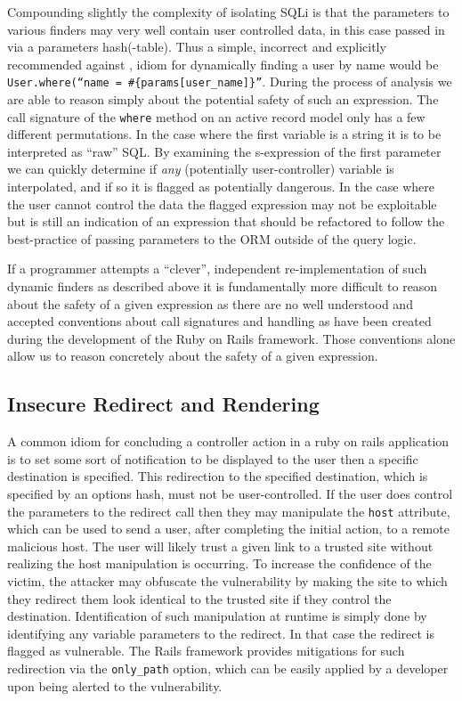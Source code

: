 \documentclass[conference]{IEEEtran}
\begin{document}
Compounding slightly the complexity of isolating SQLi is that the parameters to various
finders may very well contain user controlled data, in this case passed in via a
parameters hash(-table).  Thus a simple, incorrect and explicitly recommended against
\cite{rails_security}, idiom for dynamically
finding a user by name would be \texttt{User.where(``name = \#\{params[user\_name]\}''}.
During the process of analysis we are able to reason simply about the
potential safety of such an expression.  The call signature of the
\texttt{where} method on an active record model only has a few different
permutations.  In the case where the first variable is a string it is to be
interpreted as ``raw'' SQL.  By examining the s-expression of the first
parameter we can quickly determine if \emph{any} (potentially user-controller)
variable is interpolated, and if so it is flagged as potentially dangerous.  In
the case where the user cannot control the data the flagged expression may not
be exploitable but is still an indication of an expression that should be
refactored to follow the best-practice of passing parameters to the ORM outside
of the query logic\cite{ruby_security_sqli}.

If a programmer attempts a ``clever'', independent re-implementation of such
dynamic finders as described above it is fundamentally more difficult to reason
about the safety of a given expression as there are no well understood and
accepted conventions about call signatures and handling as have been created
during the development of the Ruby on Rails framework.  Those conventions alone
allow us to reason concretely about the safety of a given expression.

\subsection{Insecure Redirect and Rendering}

A common idiom for concluding a controller action in a ruby on rails application
is to set some sort of notification to be displayed to the user then a specific
destination is specified.  This redirection to the specified destination, which is
specified by an options hash, must not be user-controlled.  If the user does control the
parameters to the redirect call then they may manipulate the \texttt{host} attribute,
which can be used to send a user, after completing the initial action, to a remote
malicious host\cite{OWASP_redirect}.  The user will likely trust a given link to a trusted
site without realizing the host manipulation is occurring. To increase the confidence of
the victim, the attacker may obfuscate the vulnerability by making the site to which they
redirect them look identical to the trusted site if they control the destination.
Identification of such manipulation at runtime is simply done by identifying any variable
parameters to the redirect.  In that case the redirect is flagged as vulnerable.  The
Rails framework provides mitigations for such redirection via the \texttt{only\_path}
option, which can be easily applied by a developer upon being alerted to the
vulnerability.
\end{document}
